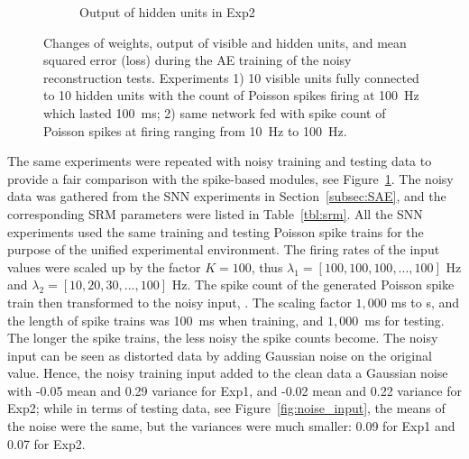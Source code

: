 \begin{figure}
\begin{subfigure}[t]{0.45\textwidth}
		\caption{Output of hidden units in Exp2}
	\end{subfigure}
	\caption{Changes of weights, output of visible and hidden units, and mean squared error (loss) during the AE training of the noisy reconstruction tests. 
		Experiments 1) 10 visible units fully connected to 10 hidden units with the count of Poisson spikes firing at 100~Hz which lasted 100~ms; 2) \DIFaddbeginFL {}\DIFaddendFL same network fed with spike count of Poisson spikes at firing \DIFdelbeginFL {}\DIFdelendFL \DIFaddbeginFL {}\DIFaddendFL ranging from 10~Hz to 100~Hz.}
	\label{fig:ae_noise}
\end{figure}

The same experiments were repeated with noisy training and testing data to provide a fair comparison with the spike-based \DIFdelbegin {}\DIFdelend \DIFaddbegin {}\DIFaddend modules, see Figure~\ref{fig:ae_noise}.
The noisy data was gathered from the SNN experiments in Section~\ref{subsec:SAE}, and the corresponding SRM parameters were listed in Table~\ref{tbl:srm}.
All the SNN experiments used the same training and testing Poisson spike trains for the purpose of the unified experimental environment.
The firing rates of the input values were scaled up by the factor $K = 100$, thus $\lambda_1 = [100, 100, 100, ..., 100]$ Hz and $\lambda_2 = [10, 20, 30, ..., 100]$ Hz.
The spike count \DIFdelbegin {}\DIFdelend \DIFaddbegin {}\DIFaddend of the generated Poisson spike train then transformed to the noisy input, \DIFdelbegin {}\DIFdelend \DIFaddbegin {}\DIFaddend .
The scaling factor $1,000$ \DIFdelbegin {}\DIFdelend \DIFaddbegin {}\DIFaddend ms to s, and the length of spike trains \DIFdelbegin {}\DIFdelend \DIFaddbegin {}\DIFaddend was 100~ms when training, and $1,000$~ms for testing.
The longer the spike trains, the less noisy the spike counts become.
The noisy input can be seen as distorted data by adding Gaussian noise on the original value.
Hence, the noisy training input added to the clean data a Gaussian noise with -0.05 mean and 0.29 variance for Exp1, and -0.02 mean and 0.22 variance for Exp2;
while in terms of testing data, see Figure~\ref{fig:noise_input}, the means of the noise were the same, but the variances were much smaller: 0.09 for Exp1 and 0.07 for Exp2.
